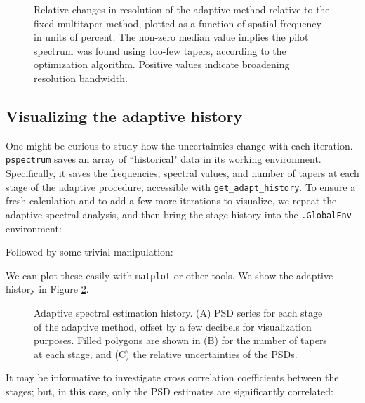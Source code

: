 \documentclass[10pt]{article}\usepackage[]{graphicx}\usepackage[]{color}
\newcommand{\Rcmd}[1]{\texttt{#1}}
\begin{document}
\begin{figure}[!htbp]
\begin{center}

\caption{Relative changes in resolution of the adaptive method
relative to the fixed multitaper method, plotted
as a function of spatial frequency in units of percent. 
The non-zero median value implies the pilot spectrum was found using too-few tapers,
according to the optimization algorithm.  Positive values indicate broadening
resolution bandwidth.
}
\label{fig:magres}
\end{center}
\end{figure}

\clearpage

\subsection{Visualizing the adaptive history}
One might be curious to study how the uncertainties change with each iteration.
\Rcmd{pspectrum} saves an array of ``historical" data in its working environment.
Specifically, it saves the frequencies, spectral values, and number of tapers at each stage of the adaptive
procedure, accessible with \Rcmd{get\_adapt\_history}. To ensure a fresh calculation and to 
add a few more iterations to visualize, we repeat the adaptive spectral analysis, 
and then bring the stage history into the \Rcmd{.GlobalEnv} environment:

Followed by some trivial manipulation:

We can plot these easily with \Rcmd{matplot} or other tools.  We show
the adaptive history in Figure \ref{fig:psdhist}.  

\begin{figure}[!htbp]
\begin{center}




\caption{Adaptive spectral estimation history.
(A) PSD series for each stage of the adaptive method, 
offset by a few decibels for visualization purposes.
Filled polygons are shown in (B) for the number of tapers at each stage,
and (C) the relative uncertainties of the PSDs.
}
\label{fig:psdhist}
\end{center}
\end{figure}

\clearpage

It may be informative to investigate cross correlation coefficients between the stages;
but, in this case, only the PSD estimates are significantly correlated:


\end{document}
